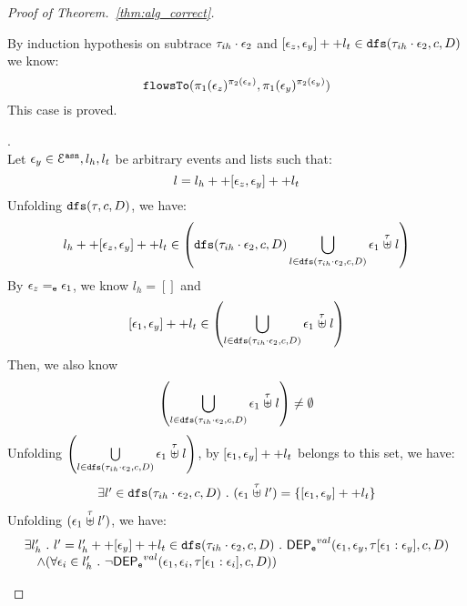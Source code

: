 \begin{proof}[Proof of Theorem.~\ref{thm:alg_correct}]
\begin{case}
\begin{subcase}
\begin{subsubcase}
%
%
By induction hypothesis on subtrace $\mathtt{\tau}_{ih} \cdot \mathtt{\epsilon}_2$ and $[\mathtt{\epsilon}_z, \mathtt{\epsilon}_y] ++ l_t 
  \in \mathtt{dfs}(\mathtt{\tau}_{ih} \cdot \mathtt{\epsilon}_2, c, D)$ we know:
\[
  \mathtt{flowsTo}(\pi_1(\mathtt{\epsilon}_z)^{\pi_2(\mathtt{\epsilon}_z)}, \pi_1(\mathtt{\epsilon}_y)^{\pi_2(\mathtt{\epsilon}_y)})
\]
This case is proved.
%
\end{subsubcase}
%
\begin{subsubcase}.
\\
Let $\mathtt{\epsilon}_y \in \mathcal{E}^{\mathtt{{asn}}}, l_h, l_t$ be arbitrary events and lists such that:
\[                                                                                                                                                                                                                                                                                                                                                                                                          
  l = l_h ++ [\mathtt{\epsilon}_z, \mathtt{\epsilon}_y] ++ l_t 
\]
%
Unfolding $\mathtt{dfs}(\mathtt{\tau}, c, D)$, we have:
%
\[
  l_h ++ [\event_z, \event_y] ++ l_t  \in 
  \left( \kw{dfs}(\trace_{ih} \cdot \event_2, c, D) \bigcup\limits_{l \in \kw{dfs}(\trace_{ih} \cdot \event_2, c, D)} 
  \event_1 \stackrel{\trace}{\uplus} l \right)
\]
By $\mathtt{\epsilon}_z =_{\mathtt{e}} \mathtt{\epsilon}_1$, we know $l_h = []$ and 
\[
  [\event_1, \event_y] ++ l_t  \in 
  \left( \bigcup\limits_{l \in \kw{dfs}(\trace_{ih} \cdot \event_2, c, D)} 
  \event_1 \stackrel{\trace}{\uplus} l \right)
\]
%
Then, we also know
\[
  \left( \bigcup\limits_{l \in \kw{dfs}(\trace_{ih} \cdot \event_2, c, D)} 
  \event_1 \stackrel{\trace}{\uplus} l \right) \neq \emptyset
\]
%
Unfolding $\left( \bigcup\limits_{l \in \kw{dfs}(\trace_{ih} \cdot \event_2, c, D)} 
  \event_1 \stackrel{\trace}{\uplus} l \right)$, by $[\mathtt{\epsilon}_1, \mathtt{\epsilon}_y] ++ l_t $ belongs to this set, we have:
\[
\begin{array}{l}
  \exists l' \in \mathtt{dfs}(\mathtt{\tau}_{ih}\cdot \mathtt{\epsilon}_2, c, D) ~.~
   (\mathtt{\epsilon}_1 \stackrel{\mathtt{\tau}}{\uplus} l') = \{[\mathtt{\epsilon}_1, \mathtt{\epsilon}_y] ++ l_t\}
\end{array}
\]
%
Unfolding $(\mathtt{\epsilon}_1 \stackrel{\mathtt{\tau}}{\uplus} l') $, we have:
\[
\begin{array}{l}
  \exists l_{h}' ~.~ l' = l_{h}' ++ [\mathtt{\epsilon}_y] ++ l_t \in \mathtt{dfs}(\mathtt{\tau}_{ih}\cdot \mathtt{\epsilon}_2, c, D) ~.~
  \mathsf{DEP_{\mathtt{e}}}^{val}(\mathtt{\epsilon}_1, \mathtt{\epsilon}_y, \mathtt{\tau}[\mathtt{\epsilon}_1:\mathtt{\epsilon}_y], c, D)
  \\ \quad \land 
  (\forall \mathtt{\epsilon}_i \in l_{h}' ~.~ \neg \mathsf{DEP_{\mathtt{e}}}^{val} (\mathtt{\epsilon}_1, \mathtt{\epsilon}_i, \mathtt{\tau}[\mathtt{\epsilon}_1: \mathtt{\epsilon}_i], c, D))

\end{array}\]
\end{subsubcase}
\end{subcase}
\end{case}
\end{proof}
